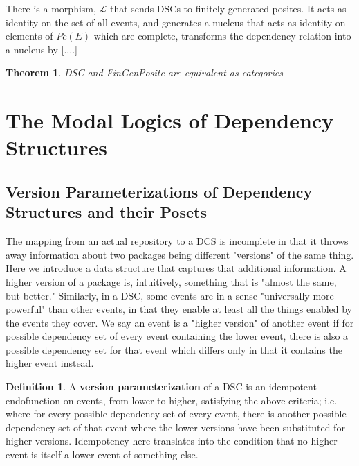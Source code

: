 \documentclass[hoptionsi,review,format=acmsmall]{acmart}
\newtheorem{theorem}{Theorem}[section]
\theoremstyle{definition}
\newtheorem{definition}{Definition}[section]
\newcommand{\Lcc}{\mathcal{L}}
\begin{document}
There is a morphism, \(\Lcc\) that sends DSCs to finitely generated posites. It acts as identity on the set of all events, and generates a nucleus that acts as identity on elements of \(Pc(E)\) which are complete,  transforms the dependency relation into a nucleus by [....]


\begin{theorem}
DSC and FinGenPosite are equivalent as categories
\end{theorem}





\section{The Modal Logics of Dependency Structures}
\subsection{Version Parameterizations of Dependency Structures and their Posets}

The mapping from an actual repository to a DCS is incomplete in that it throws away information about two packages being different "versions" of the same thing. Here we introduce a data structure that captures that additional information. A higher version of a package is, intuitively, something that is "almost the same, but better." Similarly, in a DSC, some events are in a sense "universally more powerful" than other events, in that they enable at least all the things enabled by the events they cover. We say an event is a "higher version" of another event if for possible dependency set of every event containing the lower event, there is also a possible dependency set for that event which differs only in that it contains the higher event instead.

\begin{definition}
A \textbf{version parameterization} of a DSC is an idempotent endofunction on events, from lower to higher, satisfying the above criteria; i.e. where for every possible dependency set of every event, there is another possible dependency set of that event where the lower versions have been substituted for higher versions. Idempotency here translates into the condition that no higher event is itself a lower event of something else.
\end{definition}
\end{document}

